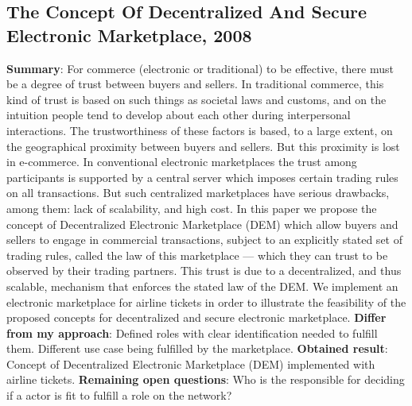 \documentclass[11pt]{article}
\begin{document}
\subsection{The Concept Of Decentralized And Secure Electronic Marketplace, 2008 \cite{Serban2008}}
\textbf{Summary}: For commerce (electronic or traditional) to be effective, there must be a degree of trust between buyers and sellers. In traditional commerce, this kind of trust is based on such things as societal laws and customs, and on the intuition people tend to develop about each other during interpersonal interactions. The trustworthiness of these factors is based, to a large extent, on the geographical proximity between buyers and sellers. But this proximity is lost in e-commerce. In conventional electronic marketplaces the trust among participants is supported by a central server which imposes certain trading rules on all transactions. But such centralized marketplaces have serious drawbacks, among them: lack of scalability, and high cost. In this paper we propose the concept of Decentralized Electronic Marketplace (DEM) which allow buyers and sellers to engage in commercial transactions, subject to an explicitly stated set of trading rules, called the law of this marketplace — which they can trust to be observed by their trading partners. This trust is due to a decentralized, and thus scalable, mechanism that enforces the stated law of the DEM. We implement an electronic marketplace for airline tickets in order to illustrate the feasibility of the proposed concepts for decentralized and secure electronic marketplace.\newline
\textbf{Differ from my approach}: Defined roles with clear identification needed to fulfill them. Different use case being fulfilled by the marketplace.\newline
\textbf{Obtained result}: Concept of Decentralized Electronic Marketplace (DEM) implemented with airline tickets.\newline
\textbf{Remaining open questions}: Who is the responsible for deciding if a actor is fit to fulfill a role on the network?\newline
\end{document}
